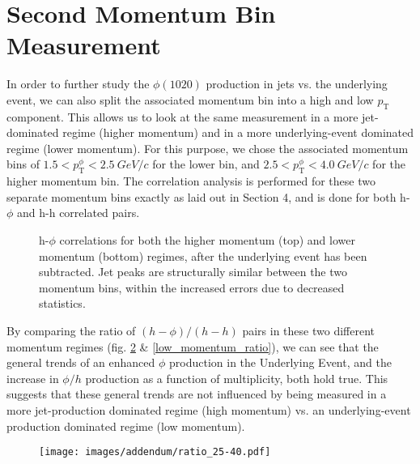 \documentclass[ALICE,manyauthors]{ALICE_analysis_notes}
\begin{document}
\clearpage
\appendix
\section{Second Momentum Bin Measurement}

In order to further study the $\phi(1020)$ production in jets vs. the underlying event, we can also split the associated momentum bin into a high and low $p_{\text{T}}$ component.  This allows us to look at the same measurement in a more jet-dominated regime (higher momentum) and in a more underlying-event dominated regime (lower momentum). For this purpose, we chose the associated momentum bins of $1.5 < p^{\phi}_{\text{T}} < \SI{2.5}{GeV/c}$ for the lower bin, and $2.5 < p^{\phi}_{\text{T}} < \SI{4.0}{GeV/c}$ for the higher momentum bin.  The correlation analysis is performed for these two separate momentum bins exactly as laid out in Section 4, and is done for both h-$\phi$ and h-h correlated pairs.

\begin{figure}[ht]
\centering
\begin{subfigure}{
\texttt{[image: images/addendum/dphi\_hphi\_25-40.pdf]}}
\end{subfigure}
\begin{subfigure}{
\texttt{[image: images/addendum/dphi\_hphi\_15-25.pdf]}}
\end{subfigure}
\caption{h-$\phi$ correlations for both the higher momentum (top) and lower momentum (bottom) regimes, after the underlying event has been subtracted.  Jet peaks are structurally similar between the two momentum bins, within the increased errors due to decreased statistics.}
\label{split_momentum_corr}
\end{figure}

By comparing the ratio of $(h-\phi)/(h-h)$ pairs in these two different momentum regimes (fig. \ref{high_momentum_ratio} \& \ref{low_momentum_ratio}), we can see that the general trends of an enhanced $\phi$ production in the Underlying Event, and the increase in $\phi/h$ production as a function of multiplicity, both hold true.  This suggests that these general trends are not influenced by being measured in a more jet-production dominated regime (high momentum) vs. an underlying-event production dominated regime (low momentum).

\begin{figure}[ht]
\centering
\texttt{[image: images/addendum/ratio\_25-40.pdf]}
\caption{}
\label{high_momentum_ratio}
\end{figure}
\end{document}
